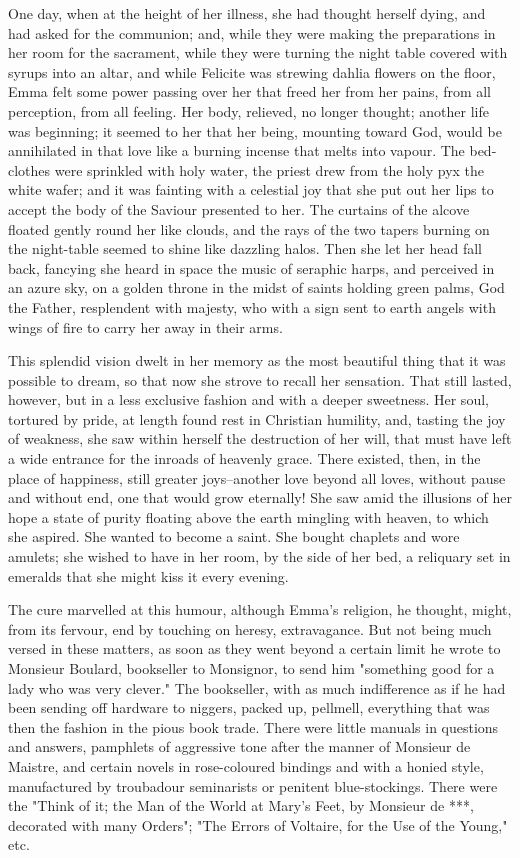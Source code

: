 \documentclass[11pt,twocolumn]{ltugboat}
\begin{document}
One day, when at the height of her illness, she had thought herself
dying, and had asked for the communion; and, while they were making the
preparations in her room for the sacrament, while they were turning the
night table covered with syrups into an altar, and while Felicite was
strewing dahlia flowers on the floor, Emma felt some power passing
over her that freed her from her pains, from all perception, from
all feeling. Her body, relieved, no longer thought; another life was
beginning; it seemed to her that her being, mounting toward God, would
be annihilated in that love like a burning incense that melts into
vapour. The bed-clothes were sprinkled with holy water, the priest drew
from the holy pyx the white wafer; and it was fainting with a celestial
joy that she put out her lips to accept the body of the Saviour
presented to her. The curtains of the alcove floated gently round her
like clouds, and the rays of the two tapers burning on the night-table
seemed to shine like dazzling halos. Then she let her head fall back,
fancying she heard in space the music of seraphic harps, and perceived
in an azure sky, on a golden throne in the midst of saints holding green
palms, God the Father, resplendent with majesty, who with a sign sent to
earth angels with wings of fire to carry her away in their arms.

This splendid vision dwelt in her memory as the most beautiful thing
that it was possible to dream, so that now she strove to recall her
sensation. That still lasted, however, but in a less exclusive fashion
and with a deeper sweetness. Her soul, tortured by pride, at length
found rest in Christian humility, and, tasting the joy of weakness, she
saw within herself the destruction of her will, that must have left a
wide entrance for the inroads of heavenly grace. There existed, then,
in the place of happiness, still greater joys--another love beyond all
loves, without pause and without end, one that would grow eternally! She
saw amid the illusions of her hope a state of purity floating above the
earth mingling with heaven, to which she aspired. She wanted to become
a saint. She bought chaplets and wore amulets; she wished to have in her
room, by the side of her bed, a reliquary set in emeralds that she might
kiss it every evening.

The cure marvelled at this humour, although Emma's religion, he thought,
might, from its fervour, end by touching on heresy, extravagance. But
not being much versed in these matters, as soon as they went beyond a
certain limit he wrote to Monsieur Boulard, bookseller to Monsignor,
to send him "something good for a lady who was very clever." The
bookseller, with as much indifference as if he had been sending off
hardware to niggers, packed up, pellmell, everything that was then the
fashion in the pious book trade. There were little manuals in questions
and answers, pamphlets of aggressive tone after the manner of Monsieur
de Maistre, and certain novels in rose-coloured bindings and with
a honied style, manufactured by troubadour seminarists or penitent
blue-stockings. There were the "Think of it; the Man of the World at
Mary's Feet, by Monsieur de ***, decorated with many Orders"; "The
Errors of Voltaire, for the Use of the Young," etc.
\end{document}

